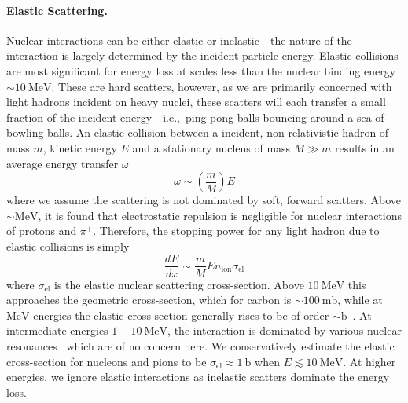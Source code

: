 \documentclass[twocolumn, preprintnumbers,amsmath,amssymb,prd, superscriptaddress]{revtex4}
\newcommand{\MeV}{\text{MeV}}
\def\r{\right)}
\def\l{\left(}
\begin{document}
\begin{appendices}
\paragraph{Elastic Scattering.}
Nuclear interactions can be either elastic or inelastic - the nature of the interaction is largely determined by the incident particle energy.
Elastic collisions are most significant for energy loss at scales less than the nuclear binding energy $\sim 10 ~\text{MeV}$.
These are hard scatters, however, as we are primarily concerned with light hadrons incident on heavy nuclei, these scatters will each transfer a small fraction of the incident energy - i.e.,~ping-pong balls bouncing around a sea of bowling balls.
An elastic collision between a incident, non-relativistic hadron of mass $m$, kinetic energy $E$ and a stationary nucleus of mass $M \gg m$ results in an average energy transfer $\omega$
\begin{equation}
\label{eq:elasticratio}
\omega \sim \l \frac{m}{M}\r E
\end{equation}
where we assume the scattering is not dominated by soft, forward scatters.
Above $\sim \text{MeV}$, it is found that electrostatic repulsion is negligible for nuclear interactions of protons and $\pi^+$.
Therefore, the stopping power for any light hadron due to elastic collisions is simply
\begin{equation}
  \frac{dE}{dx} \sim \frac{m}{M} E n_\text{ion} \sigma_\text{el}
\end{equation}
where $\sigma_\text{el}$ is the elastic nuclear scattering cross-section.
Above $10 ~\MeV$ this approaches the geometric cross-section, which for carbon is $\sim 100 ~\text{mb}$, while at $\MeV$ energies the elastic cross section generally rises to be of order $\sim \text{b}$~\cite{Tavernier}.
At intermediate energies $1 - 10 ~\MeV$, the interaction is dominated by various nuclear resonances~\cite{Tavernier} which are of no concern here.
We conservatively estimate the elastic cross-section for nucleons and pions to be $\sigma_\text{el} \approx 1 ~\text{b}$ when $E \lesssim 10 ~\MeV$.
At higher energies, we ignore elastic interactions as inelastic scatters dominate the energy loss.


\end{appendices}
\end{document}
